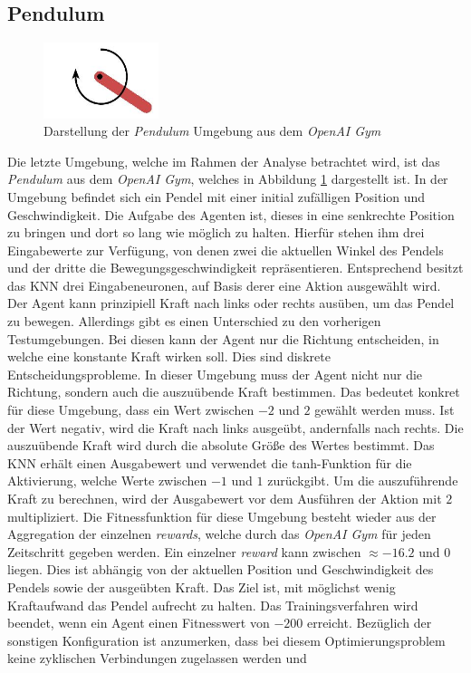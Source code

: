 \subsection{Pendulum}
\label{subsec:analysis_pendulum}
\begin{figure}[!h]
	\centering
	\includegraphics[width=0.3\textwidth]{./img/pendulum_env.JPG} 
	\caption{Darstellung der \emph{Pendulum} Umgebung aus dem \emph{OpenAI Gym}}
	\label{fig:pendulum_env}
\end{figure}
\noindent
Die letzte Umgebung, welche im Rahmen der Analyse betrachtet wird, ist das \emph{Pendulum} aus dem \emph{OpenAI Gym}, welches in Abbildung \ref{fig:pendulum_env} dargestellt ist. In der Umgebung befindet sich ein Pendel mit einer initial zufälligen Position und Geschwindigkeit. Die Aufgabe des Agenten ist, dieses in eine senkrechte Position zu bringen und dort so lang wie möglich zu halten. Hierfür stehen ihm drei Eingabewerte zur Verfügung, von denen zwei die aktuellen Winkel des Pendels und der dritte die Bewegungsgeschwindigkeit repräsentieren. Entsprechend besitzt das \ac{KNN} drei Eingabeneuronen, auf Basis derer eine Aktion ausgewählt wird. Der Agent kann prinzipiell Kraft nach links oder rechts ausüben, um das Pendel zu bewegen. Allerdings gibt es einen Unterschied zu den vorherigen Testumgebungen. Bei diesen kann der Agent nur die Richtung entscheiden, in welche eine konstante Kraft wirken soll. Dies sind diskrete Entscheidungsprobleme. In dieser Umgebung muss der Agent nicht nur die Richtung, sondern auch die auszuübende Kraft bestimmen. Das bedeutet konkret für diese Umgebung, dass ein Wert zwischen $-2$ und $2$ gewählt werden muss. Ist der Wert negativ, wird die Kraft nach links ausgeübt, andernfalls nach rechts. Die auszuübende Kraft wird durch die absolute Größe des Wertes bestimmt. Das \ac{KNN} erhält einen Ausgabewert und verwendet die \ac{tanh}-Funktion für die Aktivierung, welche Werte zwischen $-1$ und $1$ zurückgibt. Um die auszuführende Kraft zu berechnen, wird der Ausgabewert vor dem Ausführen der Aktion mit $2$ multipliziert. Die Fitnessfunktion für diese Umgebung besteht wieder aus der Aggregation der einzelnen \emph{rewards}, welche durch das \emph{OpenAI Gym} für jeden Zeitschritt gegeben werden. Ein einzelner \emph{reward} kann zwischen $\approx -16.2$ und $0$ liegen. Dies ist abhängig von der aktuellen Position und Geschwindigkeit des Pendels sowie der ausgeübten Kraft. Das Ziel ist, mit möglichst wenig Kraftaufwand das Pendel aufrecht zu halten. Das Trainingsverfahren wird beendet, wenn ein Agent einen Fitnesswert von $-200$ erreicht. Bezüglich der sonstigen Konfiguration ist anzumerken, dass bei diesem Optimierungsproblem keine zyklischen Verbindungen zugelassen werden und 